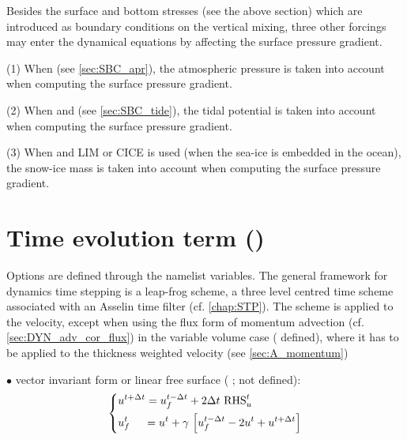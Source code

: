 \documentclass[../main/NEMO_manual]{subfiles}
\begin{document}
Besides the surface and bottom stresses (see the above section)
which are introduced as boundary conditions on the vertical mixing,
three other forcings may enter the dynamical equations by affecting the surface pressure gradient. 

(1) When  (see \autoref{sec:SBC_apr}),
the atmospheric pressure is taken into account when computing the surface pressure gradient.

(2) When  and  (see \autoref{sec:SBC_tide}),
the tidal potential is taken into account when computing the surface pressure gradient.

(3) When  and LIM or CICE is used
(\ie when the sea-ice is embedded in the ocean),
the snow-ice mass is taken into account when computing the surface pressure gradient.



\section{Time evolution term (\protect{})}
\label{sec:DYN_nxt}



Options are defined through the  namelist variables.
The general framework for dynamics time stepping is a leap-frog scheme,
\ie a three level centred time scheme associated with an Asselin time filter (cf. \autoref{chap:STP}).
The scheme is applied to the velocity, except when
using the flux form of momentum advection (cf. \autoref{sec:DYN_adv_cor_flux})
in the variable volume case ( defined),
where it has to be applied to the thickness weighted velocity (see \autoref{sec:A_momentum})  

$\bullet$ vector invariant form or linear free surface
( ;  not defined):
\[
  \left\{
    \begin{aligned}
      &u^{t+\Delta t} = u_f^{t-\Delta t} + 2\Delta t  \ \text{RHS}_u^t  	\\
      &u_f^t \;\quad = u^t+\gamma \,\left[ {u_f^{t-\Delta t} -2u^t+u^{t+\Delta t}} \right]
    \end{aligned}
  \right.
\]
\end{document}
